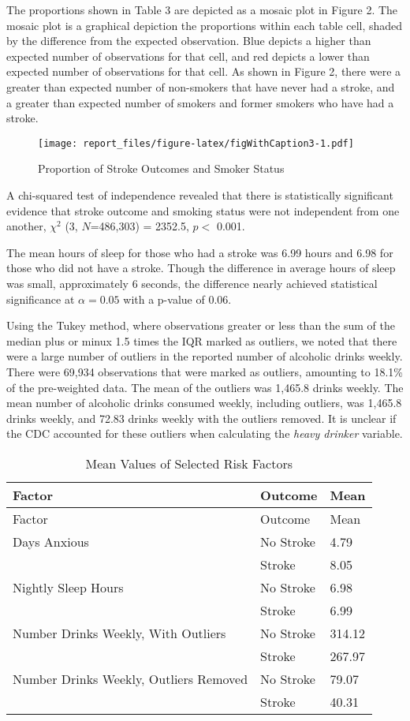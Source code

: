 \documentclass[11pt,]{article}
\begin{document}
The proportions shown in Table 3 are depicted as a mosaic plot in Figure
2. The mosaic plot is a graphical depiction the proportions within each
table cell, shaded by the difference from the expected observation. Blue
depicts a higher than expected number of observations for that cell, and
red depicts a lower than expected number of observations for that cell.
As shown in Figure 2, there were a greater than expected number of
non-smokers that have never had a stroke, and a greater than expected
number of smokers and former smokers who have had a stroke.

\begin{figure}
\centering
\texttt{[image: report\_files/figure-latex/figWithCaption3-1.pdf]}
\caption{Proportion of Stroke Outcomes and Smoker Status}
\end{figure}

A chi-squared test of independence revealed that there is statistically
significant evidence that stroke outcome and smoking status were not
independent from one another, \(\chi^2\) (3, \(N\)=486,303) = 2352.5,
\(p <\) 0.001.

The mean hours of sleep for those who had a stroke was 6.99 hours and
6.98 for those who did not have a stroke. Though the difference in
average hours of sleep was small, approximately 6 seconds, the
difference nearly achieved statistical significance at \(\alpha=0.05\)
with a p-value of 0.06.

Using the Tukey method, where observations greater or less than the sum
of the median plus or minux 1.5 times the IQR marked as outliers, we
noted that there were a large number of outliers in the reported number
of alcoholic drinks weekly. There were 69,934 observations that were
marked as outliers, amounting to 18.1\% of the pre-weighted data. The
mean of the outliers was 1,465.8 drinks weekly. The mean number of
alcoholic drinks consumed weekly, including outliers, was 1,465.8 drinks
weekly, and 72.83 drinks weekly with the outliers removed. It is unclear
if the CDC accounted for these outliers when calculating the \emph{heavy
drinker} variable.

\begin{longtable}[]{@{}lll@{}}
\caption{Mean Values of Selected Risk Factors}\tabularnewline
\toprule
Factor & Outcome & Mean\tabularnewline
\midrule
\endfirsthead
\toprule
Factor & Outcome & Mean\tabularnewline
\midrule
\endhead
Days Anxious & No Stroke & 4.79\tabularnewline
& Stroke & 8.05\tabularnewline
Nightly Sleep Hours & No Stroke & 6.98\tabularnewline
& Stroke & 6.99\tabularnewline
Number Drinks Weekly, With Outliers & No Stroke & 314.12\tabularnewline
& Stroke & 267.97\tabularnewline
Number Drinks Weekly, Outliers Removed & No Stroke &
79.07\tabularnewline
& Stroke & 40.31\tabularnewline
\bottomrule
\end{longtable}
\end{document}
